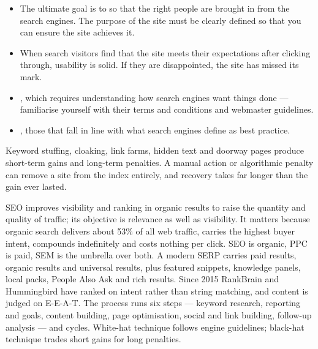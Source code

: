 \begin{itemize}
\item The ultimate goal is to  so that the
      right people are brought in from the search engines. The purpose of the
      site must be clearly defined so that you can ensure the site achieves it.
\item When search visitors find that the site meets their expectations after
      clicking through, usability is solid. If they are disappointed, the site
      has missed its mark.
\item {}, which requires understanding
      how search engines want things done --- familiarise yourself with their
      terms and conditions and webmaster guidelines.
\item {}, those that fall in line with what search
      engines define as best practice.
\end{itemize}

\begin{warnbox}
Keyword stuffing, cloaking, link farms, hidden text and doorway pages produce
short-term gains and long-term penalties. A manual action or algorithmic penalty
can remove a site from the index entirely, and recovery takes far longer than the
gain ever lasted.
\end{warnbox}

\begin{summarybox}
SEO improves visibility and ranking in organic results to raise the quantity and
quality of traffic; its objective is relevance as well as visibility. It matters
because organic search delivers about 53\% of all web traffic, carries the
highest buyer intent, compounds indefinitely and costs nothing per click. SEO is
organic, PPC is paid, SEM is the umbrella over both. A modern SERP carries paid
results, organic results and universal results, plus featured snippets,
knowledge panels, local packs, People Also Ask and rich results. Since 2015
RankBrain and Hummingbird have ranked on intent rather than string matching, and
content is judged on E-E-A-T. The process runs six steps --- keyword research,
reporting and goals, content building, page optimisation, social and link
building, follow-up analysis --- and cycles. White-hat technique follows engine
guidelines; black-hat technique trades short gains for long penalties.
\end{summarybox}

